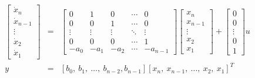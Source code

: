 \begin{slide}\label{slide:l5s6-2}

\begin{eqnarray*} \left[\begin{array}{c}
  \dot{x}_{n} \\
  \dot{x}_{n-1} \\
  \vdots \\
  \dot{x}_{2} \\
  \dot{x}_{1}
\end{array}\right] &=& \left[\begin{array}{ccccc}
  0 & 1 & 0 & \cdots & 0 \\
  0 & 0 & 1 & \cdots & 0 \\
  \vdots & \vdots & \vdots & \ddots & \vdots \\
  0 & 0 & 0 & \cdots & 1 \\
  -a_{0} & -a_{1} & -a_{2} & \cdots & -a_{n-1}
\end{array}\right]\left[\begin{array}{c}
  {x}_{n} \\
  {x}_{n-1} \\
  \vdots \\
  {x}_{2} \\
  {x}_{1}
\end{array}\right]+\left[\begin{array}{c}
  0 \\
  0 \\
  \vdots \\
  0 \\
  1
\end{array}\right]u\\ y & = & [b_0,\ b_1,\ \dots,\ b_{n-2}, b_{n-1}]
\left[
  {x}_{n},\
  {x}_{n-1},\
  \ldots,\
  {x}_{2},\
  {x}_{1}
\right]^T
\end{eqnarray*}
\end{slide}
